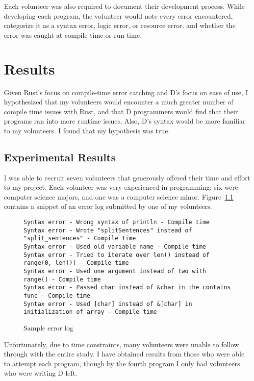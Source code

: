 \documentclass[finalcopy]{srpaper}
\begin{document}
Each volunteer was also required to document their development process. While
developing each program, the volunteer would note every error encountered,
categorize it as a syntax error, logic error, or resource error, and whether
the error was caught at compile-time or run-time.

\chapter{Results}

Given Rust's focus on compile-time error catching and D's focus on ease of
use, I hypothesized that my volunteers would encounter a much greater number
of compile time issues with Rust, and that D programmers would find that their
programs ran into more runtime issues. Also, D's syntax would be more familiar
to my volunteers. I found that my hypothesis was true.

\section{Experimental Results}

I was able to recruit seven volunteers that generously offered their time and
effort to my project. Each volunteer was very experienced in programming: six
were computer science majors, and one was a computer science minor.
Figure~\ref{fig:sampleerrorlog} contains a snippet of an error log submitted
by one of my volunteers.

\begin{figure}[h]
\begin{lstlisting}[breaklines]
Syntax error - Wrong syntax of println - Compile time
Syntax error - Wrote "splitSentences" instead of "split_sentences" - Compile time
Syntax error - Used old variable name - Compile time
Syntax error - Tried to iterate over len() instead of range(0, len()) - Compile time
Syntax error - Used one argument instead of two with range() - Compile time
Syntax error - Passed char instead of &char in the contains func - Compile time
Syntax error - Used [char] instead of &[char] in initialization of array - Compile time
\end{lstlisting}
\caption{Sample error log}
\label{fig:sampleerrorlog}
\end{figure}

Unfortunately, due to time constraints, many volunteers were unable to follow
through with the entire study. I have obtained results from those who were
able to attempt each program, though by the fourth program I only had
volunteers who were writing D left.
\end{document}
